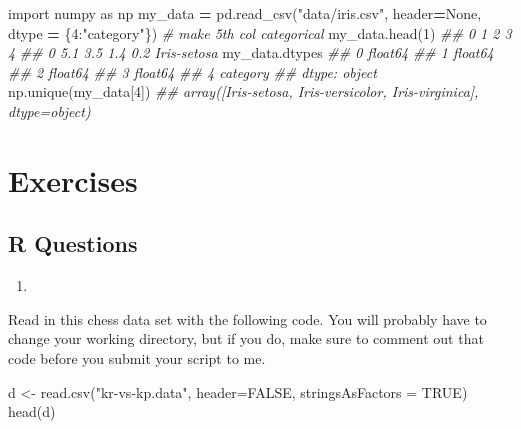 \documentclass[
  12pt,
]{krantz}
\makeatletter
\newenvironment{Shaded}{\begin{snugshade}}{\end{snugshade}}
\newcommand{\AttributeTok}[1]{\textcolor[rgb]{0.61,0.61,0.61}{#1}}
\newcommand{\CommentTok}[1]{\textcolor[rgb]{0.37,0.37,0.37}{\textit{#1}}}
\newcommand{\ConstantTok}[1]{\textcolor[rgb]{0,0,0}{#1}}
\newcommand{\DecValTok}[1]{\textcolor[rgb]{0.06,0.06,0.06}{#1}}
\newcommand{\FunctionTok}[1]{\textcolor[rgb]{0,0,0}{#1}}
\newcommand{\ImportTok}[1]{#1}
\newcommand{\NormalTok}[1]{#1}
\newcommand{\OperatorTok}[1]{\textcolor[rgb]{0.43,0.43,0.43}{\textbf{#1}}}
\newcommand{\OtherTok}[1]{\textcolor[rgb]{0.37,0.37,0.37}{#1}}
\newcommand{\StringTok}[1]{\textcolor[rgb]{0.5,0.5,0.5}{#1}}
\newcommand{\VariableTok}[1]{\textcolor[rgb]{0,0,0}{#1}}
\providecommand{\tightlist}{%
  \setlength{\itemsep}{0pt}\setlength{\parskip}{0pt}}
\newenvironment{kframe}{%
\medskip{}
\setlength{\fboxsep}{.8em}
 \def\at@end@of@kframe{}%
 \ifinner\ifhmode%
  \def\at@end@of@kframe{\end{minipage}}%
  \begin{minipage}{\columnwidth}%
 \fi\fi%
 \def\FrameCommand##1{\hskip\@totalleftmargin \hskip-\fboxsep
 \colorbox{shadecolor}{##1}\hskip-\fboxsep
     \hskip-\linewidth \hskip-\@totalleftmargin \hskip\columnwidth}%
 \MakeFramed {\advance\hsize-\width
   \@totalleftmargin\z@ \linewidth\hsize
   \@setminipage}}%
 {\par\unskip\endMakeFramed%
 \at@end@of@kframe}
\renewenvironment{Shaded}{\begin{kframe}}{\end{kframe}}
\makeatother
\begin{document}
\begin{Shaded}
\begin{Highlighting}[]
\ImportTok{import}\NormalTok{ numpy }\ImportTok{as}\NormalTok{ np}
\NormalTok{my\_data }\OperatorTok{=}\NormalTok{ pd.read\_csv(}\StringTok{"data/iris.csv"}\NormalTok{, header}\OperatorTok{=}\VariableTok{None}\NormalTok{, }
\NormalTok{                      dtype }\OperatorTok{=}\NormalTok{ \{}\DecValTok{4}\NormalTok{:}\StringTok{"category"}\NormalTok{\}) }\CommentTok{\# make 5th col categorical}
\NormalTok{my\_data.head(}\DecValTok{1}\NormalTok{)}
\CommentTok{\#\#      0    1    2    3            4}
\CommentTok{\#\# 0  5.1  3.5  1.4  0.2  Iris{-}setosa}
\NormalTok{my\_data.dtypes}
\CommentTok{\#\# 0     float64}
\CommentTok{\#\# 1     float64}
\CommentTok{\#\# 2     float64}
\CommentTok{\#\# 3     float64}
\CommentTok{\#\# 4    category}
\CommentTok{\#\# dtype: object}
\NormalTok{np.unique(my\_data[}\DecValTok{4}\NormalTok{])}
\CommentTok{\#\# array([\textquotesingle{}Iris{-}setosa\textquotesingle{}, \textquotesingle{}Iris{-}versicolor\textquotesingle{}, \textquotesingle{}Iris{-}virginica\textquotesingle{}], dtype=object)}
\end{Highlighting}
\end{Shaded}

\hypertarget{exercises-5}{%
\section{Exercises}\label{exercises-5}}

\hypertarget{r-questions-5}{%
\subsection{R Questions}\label{r-questions-5}}

\begin{enumerate}
\def\labelenumi{\arabic{enumi}.}
\tightlist
\item
\end{enumerate}

Read in this chess data set \citep{misc_chess} with the following code. You will probably have to change your working directory, but if you do, make sure to comment out that code before you submit your script to me.

\begin{Shaded}
\begin{Highlighting}[]
\NormalTok{d }\OtherTok{\textless{}{-}} \FunctionTok{read.csv}\NormalTok{(}\StringTok{"kr{-}vs{-}kp.data"}\NormalTok{, }\AttributeTok{header=}\ConstantTok{FALSE}\NormalTok{, }\AttributeTok{stringsAsFactors =} \ConstantTok{TRUE}\NormalTok{)}
\FunctionTok{head}\NormalTok{(d)}
\end{Highlighting}
\end{Shaded}
\end{document}
